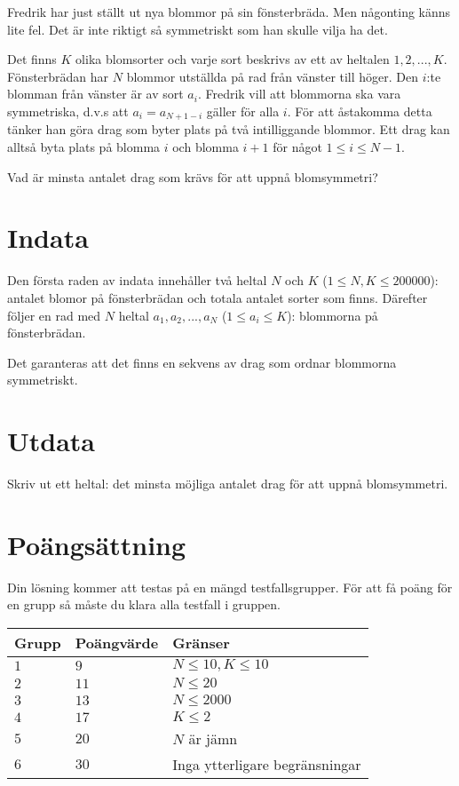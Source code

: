 
Fredrik har just ställt ut nya blommor på sin fönsterbräda. Men någonting känns lite fel. 
Det är inte riktigt så symmetriskt som han skulle vilja ha det.

Det finns $K$ olika blomsorter och varje sort beskrivs av ett av heltalen $1,2,...,K$. Fönsterbrädan har $N$ blommor utställda på rad från vänster till höger.
Den $i$:te blomman från vänster är av sort $a_i$.
Fredrik vill att blommorna ska vara symmetriska, d.v.s att $a_i=a_{N+1-i}$ gäller för alla $i$. 
För att åstakomma detta tänker han göra drag som byter plats på två intilliggande blommor.
Ett drag kan alltså byta plats på blomma $i$ och blomma $i+1$ för något $1\le i \le N-1$.

Vad är minsta antalet drag som krävs för att uppnå blomsymmetri?
\section*{Indata}

Den första raden av indata innehåller två heltal $N$ och $K$ ($1 \le N,K \le 200 000$): 
antalet blomor på fönsterbrädan och totala antalet sorter som finns.
Därefter följer en rad med $N$ heltal $a_1,a_2,...,a_N$ ($1\le a_i \le K$): blommorna på fönsterbrädan.

Det garanteras att det finns en sekvens av drag som ordnar blommorna symmetriskt.

\section*{Utdata}

Skriv ut ett heltal: det minsta möjliga antalet drag för att uppnå blomsymmetri.

\section*{Poängsättning}
Din lösning kommer att testas på en mängd testfallsgrupper.
För att få poäng för en grupp så måste du klara alla testfall i gruppen.

\noindent
\begin{tabular}{| l | l | l |}
  \hline
  Grupp & Poängvärde & Gränser \\ \hline
  $1$    & $9$         &  $N\le 10, K \le 10$ \\ \hline
  $2$    & $11$        &  $N \le 20$ \\ \hline
  $3$    & $13$        &  $N \le 2000$ \\ \hline
  $4$    & $17$        &  $K \le 2$ \\ \hline
  $5$    & $20$        &  $N$ är jämn \\ \hline 
  $6$    & $30$        &  Inga ytterligare begränsningar \\ \hline
\end{tabular}

